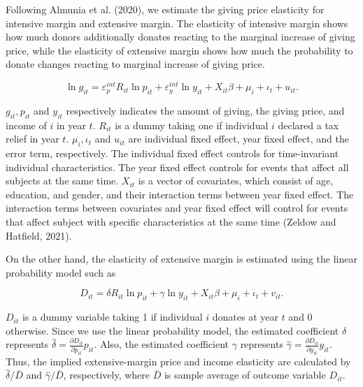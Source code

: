 \documentclass[
  11pt,
  a4paper,
]{article}
\begin{document}
Following Almunia et al. (2020), we estimate the giving price elasticity for intensive margin and extensive margin. The elasticity of intensive margin shows how much donors additionally donates reacting to the marginal increase of giving price, while the elasticity of extensive margin shows how much the probability to donate changes reacting to marginal increase of giving price.

\begin{equation}
    \ln g_{it} = \varepsilon^{int}_p R_{it} \ln p_{it} + \varepsilon^{int}_y \ln y_{it} 
    + X_{it}\beta +\mu_i +\iota_t +u_{it}. \label{eq:intensive}
\end{equation}

\(g_{it}, p_{it}\) and \(y_{it}\) respectively indicates the amount of giving, the giving price, and income of \(i\) in year \(t\).
\(R_{it}\) is a dummy taking one if individual \(i\) declared a tax relief in year \(t\).
\(\mu_i, \iota_t\) and \(u_{it}\) are individual fixed effect, year fixed effect, and the error term, respectively.
The individual fixed effect controls for time-invariant individual characteristics. The year fixed effect controls for events that affect all subjects at the same time. \(X_{it}\) is a vector of covariates, which consist of age, education, and gender, and their interaction terms between year fixed effect. The interaction terms between covariates and year fixed effect will control for events that affect subject with specific characteristics at the same time (Zeldow and Hatfield, 2021).

On the other hand,
the elasticity of extensive margin is estimated using the linear probability model such as

\begin{equation}
D_{it} =  \delta R_{it} \ln p_{it} +\gamma \ln y_{it} + X_{it}\beta +\mu_i  +\iota_t +v_{it}. \label{eq:extensive}
\end{equation}

\(D_{it}\) is a dummy variable taking 1 if individual \(i\) donates at year \(t\) and 0 otherwise.
Since we use the linear probability model,
the estimated coefficient \(\delta\) represents \(\hat{\delta} = \frac{\partial D_{it}}{\partial p_{it}} p_{it}\).
Also, the estimated coefficient \(\gamma\) represents \(\hat{\gamma} = \frac{\partial D_{it}}{\partial y_{it}} y_{it}\).
Thus, the implied extensive-margin price and income elasticity are calculated by
\(\hat{\delta}/\bar{D}\) and \(\hat{\gamma}/\bar{D}\), respectively,
where \(\bar{D}\) is sample average of outcome variable \(D_{it}\).
\end{document}
